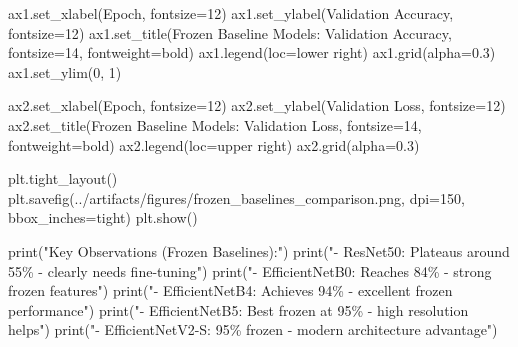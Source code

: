 \documentclass[
  letterpaper,
  DIV=11,
  numbers=noendperiod]{scrartcl}
\newenvironment{Shaded}{\begin{snugshade}}{\end{snugshade}}
\newcommand{\BuiltInTok}[1]{\textcolor[rgb]{0.00,0.23,0.31}{#1}}
\newcommand{\DecValTok}[1]{\textcolor[rgb]{0.68,0.00,0.00}{#1}}
\newcommand{\FloatTok}[1]{\textcolor[rgb]{0.68,0.00,0.00}{#1}}
\newcommand{\NormalTok}[1]{\textcolor[rgb]{0.00,0.23,0.31}{#1}}
\newcommand{\OperatorTok}[1]{\textcolor[rgb]{0.37,0.37,0.37}{#1}}
\newcommand{\SpecialCharTok}[1]{\textcolor[rgb]{0.37,0.37,0.37}{#1}}
\newcommand{\StringTok}[1]{\textcolor[rgb]{0.13,0.47,0.30}{#1}}
\renewenvironment{Shaded}{%
  \begin{tcolorbox}[%
    enhanced,%
    colback=codebg,%
    colframe=codebg,%
    borderline west={3pt}{0pt}{sectionblue},%
    boxrule=0pt,%
    arc=0pt,%
    boxsep=5pt,%
    left=2mm,%
    right=2mm,%
    top=2mm,%
    bottom=2mm%
  ]%
}{%
  \end{tcolorbox}%
}
\begin{document}
\begin{Shaded}
\begin{Highlighting}[]
\NormalTok{ax1.set\_xlabel(}\StringTok{\textquotesingle{}Epoch\textquotesingle{}}\NormalTok{, fontsize}\OperatorTok{=}\DecValTok{12}\NormalTok{)}
\NormalTok{ax1.set\_ylabel(}\StringTok{\textquotesingle{}Validation Accuracy\textquotesingle{}}\NormalTok{, fontsize}\OperatorTok{=}\DecValTok{12}\NormalTok{)}
\NormalTok{ax1.set\_title(}\StringTok{\textquotesingle{}Frozen Baseline Models: Validation Accuracy\textquotesingle{}}\NormalTok{, }
\NormalTok{              fontsize}\OperatorTok{=}\DecValTok{14}\NormalTok{, fontweight}\OperatorTok{=}\StringTok{\textquotesingle{}bold\textquotesingle{}}\NormalTok{)}
\NormalTok{ax1.legend(loc}\OperatorTok{=}\StringTok{\textquotesingle{}lower right\textquotesingle{}}\NormalTok{)}
\NormalTok{ax1.grid(alpha}\OperatorTok{=}\FloatTok{0.3}\NormalTok{)}
\NormalTok{ax1.set\_ylim(}\DecValTok{0}\NormalTok{, }\DecValTok{1}\NormalTok{)}

\NormalTok{ax2.set\_xlabel(}\StringTok{\textquotesingle{}Epoch\textquotesingle{}}\NormalTok{, fontsize}\OperatorTok{=}\DecValTok{12}\NormalTok{)}
\NormalTok{ax2.set\_ylabel(}\StringTok{\textquotesingle{}Validation Loss\textquotesingle{}}\NormalTok{, fontsize}\OperatorTok{=}\DecValTok{12}\NormalTok{)}
\NormalTok{ax2.set\_title(}\StringTok{\textquotesingle{}Frozen Baseline Models: Validation Loss\textquotesingle{}}\NormalTok{, }
\NormalTok{              fontsize}\OperatorTok{=}\DecValTok{14}\NormalTok{, fontweight}\OperatorTok{=}\StringTok{\textquotesingle{}bold\textquotesingle{}}\NormalTok{)}
\NormalTok{ax2.legend(loc}\OperatorTok{=}\StringTok{\textquotesingle{}upper right\textquotesingle{}}\NormalTok{)}
\NormalTok{ax2.grid(alpha}\OperatorTok{=}\FloatTok{0.3}\NormalTok{)}

\NormalTok{plt.tight\_layout()}
\NormalTok{plt.savefig(}\StringTok{\textquotesingle{}../artifacts/figures/frozen\_baselines\_comparison.png\textquotesingle{}}\NormalTok{, }
\NormalTok{            dpi}\OperatorTok{=}\DecValTok{150}\NormalTok{, bbox\_inches}\OperatorTok{=}\StringTok{\textquotesingle{}tight\textquotesingle{}}\NormalTok{)}
\NormalTok{plt.show()}

\BuiltInTok{print}\NormalTok{(}\StringTok{"Key Observations (Frozen Baselines):"}\NormalTok{)}
\BuiltInTok{print}\NormalTok{(}\StringTok{"{-} ResNet50: Plateaus around 55\% {-} clearly needs fine{-}tuning"}\NormalTok{)}
\BuiltInTok{print}\NormalTok{(}\StringTok{"{-} EfficientNetB0: Reaches 84\% {-} strong frozen features"}\NormalTok{)}
\BuiltInTok{print}\NormalTok{(}\StringTok{"{-} EfficientNetB4: Achieves 94\% {-} excellent frozen performance"}\NormalTok{)}
\BuiltInTok{print}\NormalTok{(}\StringTok{"{-} EfficientNetB5: Best frozen at 95\% {-} high resolution helps"}\NormalTok{)}
\BuiltInTok{print}\NormalTok{(}\StringTok{"{-} EfficientNetV2{-}S: 95}\SpecialCharTok{\% f}\StringTok{rozen {-} modern architecture advantage"}\NormalTok{)}
\end{Highlighting}
\end{Shaded}
\end{document}
